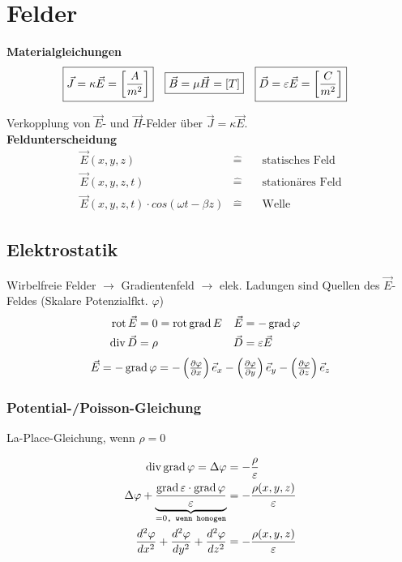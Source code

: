 \section{Felder}
\textbf{Materialgleichungen}
\begin{align*}
	\Aboxed{\vec{J}  = \kappa\vec{E} = \left[\dfrac{A}{m^2}\right]} &
	\Aboxed{\vec{B}  = \mu\vec{H} = [T]}                            &
	\Aboxed{\vec{D}  = \varepsilon\vec{E} = \left[\dfrac{C}{m^2}\right]}
\end{align*}

Verkopplung von $ \vec{E}$- und $ \vec{H}$-Felder über $ \vec{J}=\kappa\vec{E}$.\\

\textbf{Feldunterscheidung}
\begin{align*}
	 & \vec{E}(x,y,z)                               & \widehat= & \quad\text{statisches Feld}  & \\
	 & \vec{E}(x,y,z,t)                             & \widehat= & \quad\text{stationäres Feld} & \\
	 & \vec{E}(x,y,z,t)\cdot cos(\omega t -\beta z) & \widehat= & \quad\text{Welle}            &
\end{align*}

\subsection{Elektrostatik}
Wirbelfreie Felder $\rightarrow$ Gradientenfeld $\rightarrow$ elek. Ladungen
sind Quellen des $\vec{E}$-Feldes (Skalare Potenzialfkt. $ \varphi $)
\begin{align*}
	\operatorname{rot} \vec{E} & = 0 = \operatorname{rot} \operatorname{grad} E & \vec{E} & = -\operatorname{grad} \varphi    & \\
	\operatorname{div} \vec{D} & = \rho                 & \vec{D} & = \varepsilon \vec{E} &
\end{align*}
\begin{equation*}
	\vec{E} = -\operatorname{grad} \varphi = - \left( \tfrac{\partial \varphi}{\partial x}\right) \vec{e}_x - \left( \tfrac{\partial \varphi}{\partial y}\right) \vec{e}_y - \left( \tfrac{\partial \varphi}{\partial z}\right) \vec{e}_z
\end{equation*}

\subsubsection{Potential-/Poisson-Gleichung}
La-Place-Gleichung, wenn $ \rho = 0 $

\begin{align*}
	\operatorname{div} \operatorname{grad} \varphi = \Delta \varphi & = - \dfrac{\rho}{\varepsilon}           \\
	\Delta \varphi + \underbrace{ \dfrac{\operatorname{grad} \varepsilon \cdot \operatorname{grad} \varphi}{\varepsilon}}_{= 0\texttt{, wenn homogen}}
	                                        & = - \dfrac{\rho (x, y, z)}{\varepsilon} \\
	\frac{d^2 \varphi}{d x^2} + \frac{d^2 \varphi}{d y^2} + \frac{d^2 \varphi}{d z^2}
	                                        & = - \dfrac{\rho (x, y, z)}{\varepsilon}
\end{align*}

